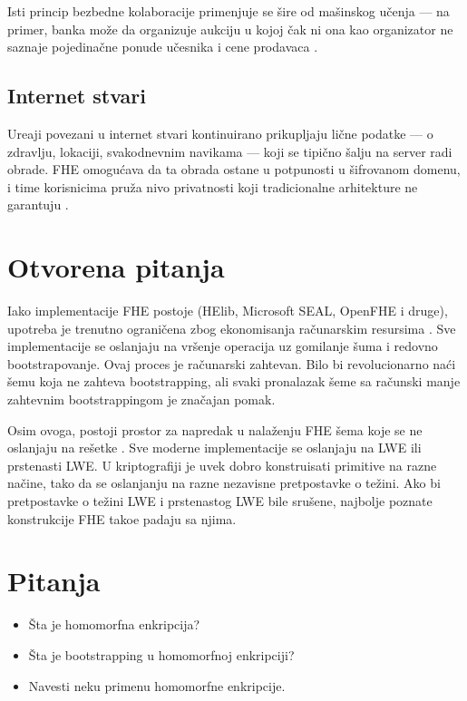 Isti princip bezbedne kolaboracije primenjuje se \v sire od ma\v sinskog u\v cenja — na primer, banka mo\v ze da organizuje aukciju u kojoj \v cak ni ona kao organizator ne saznaje pojedina\v cne ponude u\v cesnika i cene prodavaca \cite{MITHenzingerHE2}.

\subsection{Internet stvari}

Ure\dj aji povezani u internet stvari kontinuirano prikupljaju li\v cne podatke — o zdravlju, lokaciji, svakodnevnim navikama — koji se tipi\v cno \v salju na server radi obrade. FHE omogu\' cava da ta obrada ostane u potpunosti u \v sifrovanom domenu, i time korisnicima pru\v za nivo privatnosti koji tradicionalne arhitekture ne garantuju \cite{ieee2026homomorphicusecases}.

\section{Otvorena pitanja}

Iako implementacije FHE postoje (HElib, Microsoft SEAL, OpenFHE i druge), upotreba je trenutno ograni\v cena zbog ekonomisanja ra\v cunarskim resursima \cite{gentry2010computing}. 
Sve implementacije se oslanjaju na vr\v senje operacija uz gomilanje \v suma i redovno bootstrapovanje. Ovaj proces je ra\v cunarski zahtevan.
Bilo bi revolucionarno na\' ci \v semu koja ne zahteva bootstrapping, ali svaki pronalazak \v seme sa ra\v cunski manje zahtevnim bootstrappingom je zna\v cajan pomak.


Osim ovoga, postoji prostor za napredak u nala\v zenju FHE \v sema koje se ne oslanjaju na re\v setke \cite{MITHenzingerHE2}. Sve moderne implementacije se oslanjaju na LWE ili prstenasti LWE.
U kriptografiji je uvek dobro konstruisati primitive na razne na\v cine, tako da se oslanjanju na razne nezavisne pretpostavke o te\v zini. Ako bi pretpostavke o te\v zini LWE i prstenastog LWE bile sru\v sene, najbolje poznate konstrukcije FHE tako\dj e padaju sa njima. 

\section{Pitanja}
\begin{itemize}
    \item \v Sta je homomorfna enkripcija?
    \item \v Sta je bootstrapping u homomorfnoj enkripciji?
    \item Navesti neku primenu homomorfne enkripcije.
\end{itemize}




